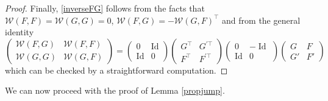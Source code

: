 \documentclass[11 pt]{amsart}
\theoremstyle{definition}
\theoremstyle{remark}
\numberwithin{equation}{section}
\begin{document}
\begin{proof}
Finally, \eqref{inverseFG} follows from the facts that $\mathcal{W}(F,F) = \mathcal{W}(G,G) =0$, $\mathcal{W}(F,G) = - \mathcal{W}(G,F)^\top$ and from the general identity
$$
\begin{pmatrix} \mathcal W(F,G) & \mathcal W(F,F) \\ \mathcal W(G,G) & \mathcal W(G,F) \end{pmatrix} = \begin{pmatrix} 0 & \operatorname{Id} \\  \operatorname{Id} & 0 \end{pmatrix} \begin{pmatrix} G^\top & G^{' \top} \\ F^\top  & F^{' \top} \end{pmatrix} \begin{pmatrix} 0 & - \operatorname{Id}\\  \operatorname{Id} & 0 \end{pmatrix} \begin{pmatrix} G & F \\ G' & F' \end{pmatrix}
$$
which can be checked by a straightforward computation.
\end{proof}

We can now proceed with the proof of Lemma \ref{propjump}.
\end{document}
